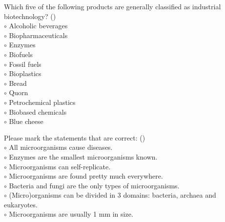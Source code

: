 \documentclass[]{beamer}
\begin{document}
\begin{CJK}{UTF8}{gbsn}
\begin{frame}[shrink] {} 
\addtocounter{questions}{1}
\color{blue}
  Which five of the following products are generally classified as industrial biotechnology?
 ({})\\
\color{black}
\setlength{\parindent}{-0.4cm}
{\color{red}$\circ$} Alcoholic beverages  \\
{\color{red}$\circ$}  Biopharmaceuticals  \\
{\color{red}$\circ$}  Enzymes   \\
{\color{red}$\circ$}  Biofuels  \\
{\color{red}$\circ$} Fossil fuels  \\
{\color{red}$\circ$}  Bioplastics  \\
{\color{red}$\circ$} Bread  \\
{\color{red}$\circ$} Quorn  \\
{\color{red}$\circ$} Petrochemical plastics  \\
{\color{red}$\circ$}  Biobased chemicals  \\
{\color{red}$\circ$} Blue cheese  \\
\end{frame}


\begin{frame}[shrink] {} 
\addtocounter{questions}{1}
\color{blue}
  Please mark the statements that are correct: 
 ({})\\
\color{black}
\setlength{\parindent}{-0.4cm}
{\color{red}$\circ$} All microorganisms cause diseases.  \\
{\color{red}$\circ$} Enzymes are the smallest microorganisms known.   \\
{\color{red}$\circ$}  Microorganisms can self-replicate.  \\
{\color{red}$\circ$}  Microorganisms are found pretty much everywhere.  \\
{\color{red}$\circ$} Bacteria and fungi are the only types of microorganisms.  \\
{\color{red}$\circ$}  (Micro)organisms can be divided in 3 domains: bacteria, archaea and eukaryotes.  \\
{\color{red}$\circ$} Microorganisms are usually 1 mm in size.  \\
\end{frame}



\end{CJK}
\end{document}
